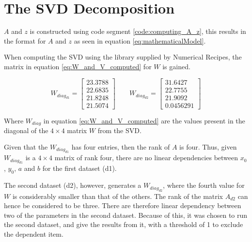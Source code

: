 \section{The SVD Decomposition}

$A$ and $z$ is constructed using code segment \ref{code:computing_A_z}, this results in the format for $A$ and $z$ as seen in equation \ref{eq:mathematicalModel}.



When computing the SVD using the library supplied by Numerical Recipes, the matrix in equation \ref{eq:W_and_V_computed} for $W$
is gained.

\begin{equation}
W_{diag_{d1}} = 
\left[
\begin{array}{c}
23.3788 \\
22.6835 \\
21.8248 \\
21.5074
\end{array}
\right]
% 
\qquad
% 
W_{diag_{d2}} = 
\left[
\begin{array}{c}
31.6427\\
22.7755\\
21.9092\\
0.0456291
\end{array}
\right]
\label{eq:W_and_V_computed}
\end{equation}

Where $W_{diag}$ in equation \ref{eq:W_and_V_computed} are the values present in the diagonal of the $4 \times 4$ matrix $W$ from the SVD.

Given that the $W_{diag_{d1}}$ has four entries, then the rank of $A$ is four. 
Thus, given $W_{diag_{d1}}$ is a $4 \times 4$ matrix of rank four, there are no linear dependencies between $x_0$, $y_0$, $a$ and $b$ for the first dataset (d1).

The second dataset (d2), however, generates a $W_{diag_{d2}}$, where the fourth value for $W$ is considerably smaller than that of the others.
The rank of the matrix $A_{d2}$ can hence be considered to be three.
There are therefore linear dependency between two of the parameters in the second dataset.
Because of this, it was chosen to run the second dataset, and give the results from it, with a threshold of 1 to exclude the dependent item.



